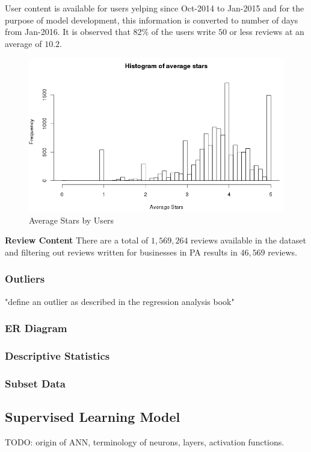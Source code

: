 \documentclass[12pt]{article}
\begin{document}
User content is available for users yelping since Oct-2014 to Jan-2015 and for the purpose of model development, this information is converted to number of days from Jan-2016. It is observed that 82\% of the users write $50$ or less reviews at an average of $10.2$. 

\begin{figure}[h]
\centering
\includegraphics[width=0.7\linewidth]{histogram_user_average_stars}
\caption{Average Stars by Users}
\label{fig:histogram_user_average_stars}
\end{figure}

\textbf{Review Content}
There are a total of $1,569,264$ reviews available in the dataset and filtering out reviews written for businesses in PA results in $46,569$ reviews.

\subsubsection{Outliers}
"define an outlier as described in the regression analysis book"




\subsubsection{ER Diagram}
\subsubsection{Descriptive Statistics}
\subsubsection{Subset Data}

\subsection{Supervised Learning Model}
TODO: origin of ANN, terminology of neurons, layers, activation functions.
\end{document}
